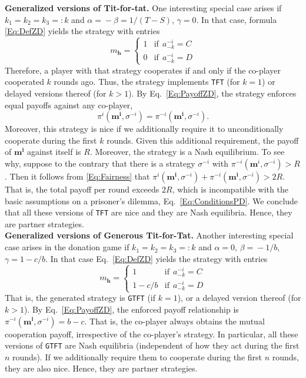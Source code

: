 \documentclass[11pt]{article}
\theoremstyle{plainCl1}
\theoremstyle{plainCl2}
\def\tft{\texttt{TFT}}
\def\gtft{\texttt{GTFT}}
\begin{document}
\noindent
{\bf Generalized versions of Tit-for-tat.} 
One interesting special case arises if $k_1\!=\!k_2\!=\!k_3\!=:\!k$ and $\alpha
\!=\! -\beta \!=\!1/(T\!-\!S)$, $\gamma \!=\! 0$. In that case, formula
\eqref{Eq:DefZD} yields the strategy with entries
\begin{equation*}
m_\mathbf{h} = \left\{
\begin{array}{ll}
1	&\text{if}~~a^{-i}_{-k}=C\\[0.2cm]
0	&\text{if}~~a^{-i}_{-k}=D
\end{array}
\right.
\end{equation*}
Therefore, a player with that strategy cooperates if and only if the co-player cooperated $k$ rounds ago. 
Thus, the strategy implements \tft{} (for $k\!=\!1$) or delayed versions thereof (for $k\!>\!1$). 
By Eq.~\eqref{Eq:PayoffZD}, the strategy enforces equal payoffs against any co-player, 
\begin{equation} \label{Eq:Fairness}
\pi^i(\mathbf{m^i},\sigma^{-i}) \!=\! \pi^{-i}(\mathbf{m^i},\sigma^{-i}).
\end{equation} 
Moreover, this strategy is nice if we additionally require it to unconditionally cooperate during the first $k$ rounds. 
Given this additional requirement, the payoff of $\mathbf{m^i}$ against itself is $R$. 
Moreover, the strategy is a Nash equilibrium. To see why, suppose to the contrary that there is a strategy $\sigma^{-i}$ with $\pi^{-i}(\mathbf{m}^i,\sigma^{-i}) \!>\! R$. Then it follows from \eqref{Eq:Fairness} that $\pi^i(\mathbf{m^i},\sigma^{-i}) \!+\! \pi^{-i}(\mathbf{m^i},\sigma^{-i})\!>\!2R$. That is, the total  payoff per round exceeds $2R$, which is incompatible with the basic assumptions on a prisoner's dilemma, Eq.~\eqref{Eq:ConditionsPD}. We conclude that all these versions of \tft{} are nice and they are Nash equilibria. Hence, they are partner strategies.\\

\noindent
{\bf Generalized versions of Generous Tit-for-Tat.}
Another interesting special case arises in the donation game if $k_1\!=\!k_2\!=\!k_3\!=:\!k$ and
$\alpha\!=\!0$, $\beta\!=\!-1/b$, $\gamma\!=\!1\!-\!c/b$. In that case
Eq.~\eqref{Eq:DefZD} yields the strategy with entries
\begin{equation*}
m_\mathbf{h} = \left\{
\begin{array}{ll}
1	&\text{if}~~a^{-i}_{-k}=C\\[0.2cm]
1-c/b	&\text{if}~~a^{-i}_{-k}=D
\end{array}
\right.
\end{equation*}
That is, the generated strategy is \gtft{} (if $k\!=\!1$), or a delayed version
thereof (for $k\!>\!1$). By Eq.~\eqref{Eq:PayoffZD}, the enforced payoff
relationship is $\pi^{-i}(\mathbf{m^{i}}, \sigma^{-i})\!=\!b\!-\!c$. 
That is, the co-player always obtains the mutual cooperation payoff, irrespective of the co-player's strategy. 
In particular, all these versions of \gtft{} are Nash equilibria  (independent of how they act during the first $n$ rounds).
If we additionally require them to cooperate during the first $n$ rounds, they are also nice. 
Hence, they are partner strategies.
\end{document}
